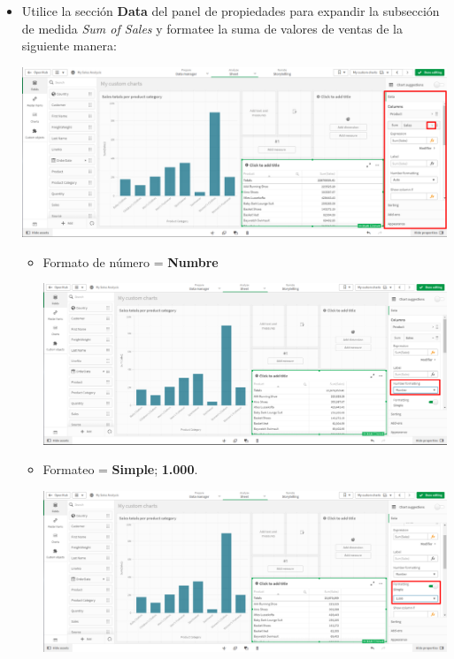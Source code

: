 \documentclass[12pt,letterpaper]{article}
\newcommand\tab[1][1cm]{\hspace*{#1}}
\begin{document}
\begin{enumerate}[\tab 1.]
\begin{enumerate}
\begin{itemize}
\begin{center}
                \end{center}
                \item Utilice la sección \textbf{Data} del panel de propiedades para expandir la subsección de medida \textit{Sum of Sales} y formatee la suma de valores de ventas de la siguiente manera:
                \begin{center}
                    \includegraphics[width=13cm]{./img/img31.4.png}
                \end{center}
                \begin{itemize}
                    \item Formato de número = \textbf{Numbre}
                    \begin{center}
                        \includegraphics[width=13cm]{./img/img31.4.1.png}
                    \end{center}
                    \item Formateo = \textbf{Simple}; \textbf{1.000}.
                    \begin{center}
                        \includegraphics[width=13cm]{./img/img31.4.2.png}

\end{center}
\end{itemize}
\end{itemize}
\end{enumerate}
\end{enumerate}
\end{document}
